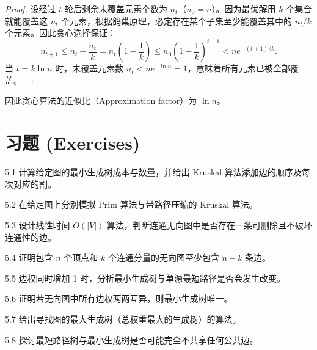 \begin{proof}
设经过 $t$ 轮后剩余未覆盖元素个数为 $n_t$（$n_0 = n$）。因为最优解用 $k$ 个集合就能覆盖这 $n_t$ 个元素，根据鸽巢原理，必定存在某个子集至少能覆盖其中的 $n_t / k$ 个元素。因此贪心选择保证：
\[
n_{t+1} \le n_t - \frac{n_t}{k} = n_t \left(1 - \frac{1}{k}\right) \le n_0 \left(1 - \frac{1}{k}\right)^{t+1} < n e^{-(t+1)/k}.
\]
当 $t = k \ln n$ 时，未覆盖元素数 $n_t < n e^{-\ln n} = 1$，意味着所有元素已被全部覆盖。
\end{proof}
因此贪心算法的近似比（Approximation factor）为 $\ln n$。

\newpage
\section*{习题 (Exercises)}

\begin{exercise}{5.1}
计算给定图的最小生成树成本与数量，并给出 Kruskal 算法添加边的顺序及每次对应的割。
\end{exercise}

\begin{exercise}{5.2}
在给定图上分别模拟 Prim 算法与带路径压缩的 Kruskal 算法。
\end{exercise}

\begin{exercise}{5.3}
设计线性时间 $O(|V|)$ 算法，判断连通无向图中是否存在一条可删除且不破坏连通性的边。
\end{exercise}

\begin{exercise}{5.4}
证明包含 $n$ 个顶点和 $k$ 个连通分量的无向图至少包含 $n - k$ 条边。
\end{exercise}

\begin{exercise}{5.5}
边权同时增加 1 时，分析最小生成树与单源最短路径是否会发生改变。
\end{exercise}

\begin{exercise}{5.6}
证明若无向图中所有边权两两互异，则最小生成树唯一。
\end{exercise}

\begin{exercise}{5.7}
给出寻找图的最大生成树（总权重最大的生成树）的算法。
\end{exercise}

\begin{exercise}{5.8}
探讨最短路径树与最小生成树是否可能完全不共享任何公共边。
\end{exercise}

